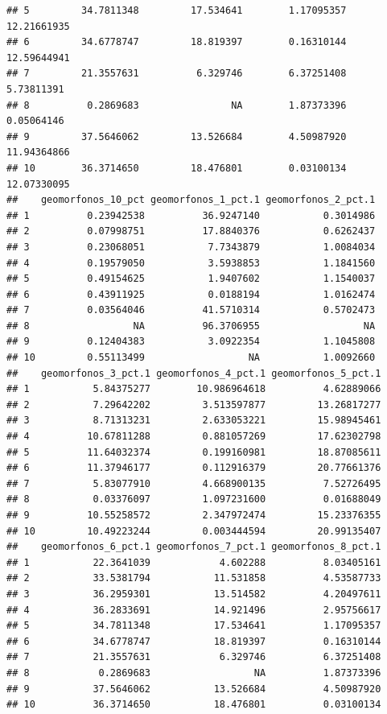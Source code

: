 \documentclass[11pt,]{article}
\begin{document}
\begin{verbatim}
## 5         34.7811348         17.534641        1.17095357       12.21661935
## 6         34.6778747         18.819397        0.16310144       12.59644941
## 7         21.3557631          6.329746        6.37251408        5.73811391
## 8          0.2869683                NA        1.87373396        0.05064146
## 9         37.5646062         13.526684        4.50987920       11.94364866
## 10        36.3714650         18.476801        0.03100134       12.07330095
##    geomorfonos_10_pct geomorfonos_1_pct.1 geomorfonos_2_pct.1
## 1          0.23942538          36.9247140           0.3014986
## 2          0.07998751          17.8840376           0.6262437
## 3          0.23068051           7.7343879           1.0084034
## 4          0.19579050           3.5938853           1.1841560
## 5          0.49154625           1.9407602           1.1540037
## 6          0.43911925           0.0188194           1.0162474
## 7          0.03564046          41.5710314           0.5702473
## 8                  NA          96.3706955                  NA
## 9          0.12404383           3.0922354           1.1045808
## 10         0.55113499                  NA           1.0092660
##    geomorfonos_3_pct.1 geomorfonos_4_pct.1 geomorfonos_5_pct.1
## 1           5.84375277        10.986964618          4.62889066
## 2           7.29642202         3.513597877         13.26817277
## 3           8.71313231         2.633053221         15.98945461
## 4          10.67811288         0.881057269         17.62302798
## 5          11.64032374         0.199160981         18.87085611
## 6          11.37946177         0.112916379         20.77661376
## 7           5.83077910         4.668900135          7.52726495
## 8           0.03376097         1.097231600          0.01688049
## 9          10.55258572         2.347972474         15.23376355
## 10         10.49223244         0.003444594         20.99135407
##    geomorfonos_6_pct.1 geomorfonos_7_pct.1 geomorfonos_8_pct.1
## 1           22.3641039            4.602288          8.03405161
## 2           33.5381794           11.531858          4.53587733
## 3           36.2959301           13.514582          4.20497611
## 4           36.2833691           14.921496          2.95756617
## 5           34.7811348           17.534641          1.17095357
## 6           34.6778747           18.819397          0.16310144
## 7           21.3557631            6.329746          6.37251408
## 8            0.2869683                  NA          1.87373396
## 9           37.5646062           13.526684          4.50987920
## 10          36.3714650           18.476801          0.03100134

\end{verbatim}
\end{document}
